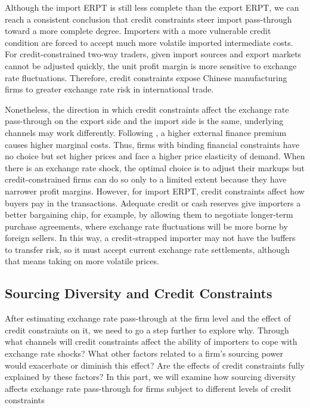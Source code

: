 \documentclass[12pt]{article}
\begin{document}
Although the import ERPT is still less complete than the export ERPT, we can reach a consistent conclusion that credit constraints steer import pass-through toward a more complete degree.  Importers with a more vulnerable credit condition are forced to accept much more volatile imported intermediate costs. For credit-constrained two-way traders, given import sources and export markets cannot be adjusted quickly, the unit profit margin is more sensitive to exchange rate fluctuations. Therefore, credit constraints expose Chinese manufacturing firms to greater exchange rate risk in international trade.

Nonetheless, the direction in which credit constraints affect the exchange rate pass-through on the export side and the import side is the same, underlying channels may work differently. Following \cite{strasser2013}, a higher external finance premium causes higher marginal costs. Thus, firms with binding financial constraints have no choice but set higher prices and face a higher price elasticity of demand. When there is an exchange rate shock, the optimal choice is to adjust their markups but credit-constrained firms can do so only to a limited extent because they have narrower profit margins. However, for import ERPT, credit constraints affect how buyers pay in the transactions. Adequate credit or cash reserves give importers a better bargaining chip, for example, by allowing them to negotiate longer-term purchase agreements, where exchange rate fluctuations will be more borne by foreign sellers. In this way, a credit-strapped importer may not have the buffers to transfer risk, so it must accept current exchange rate settlements, although that means taking on more volatile prices.

\subsection{Sourcing Diversity and Credit Constraints}

After estimating exchange rate pass-through at the firm level and the effect of credit constraints on it, we need to go a step further to explore why. Through what channels will credit constraints affect the ability of importers to cope with exchange rate shocks? What other factors related to a firm's sourcing power would exacerbate or diminish this effect? Are the effects of credit constraints fully explained by these factors? In this part, we will examine how sourcing diversity affects exchange rate pass-through for firms subject to different levels of credit constraints
\end{document}
